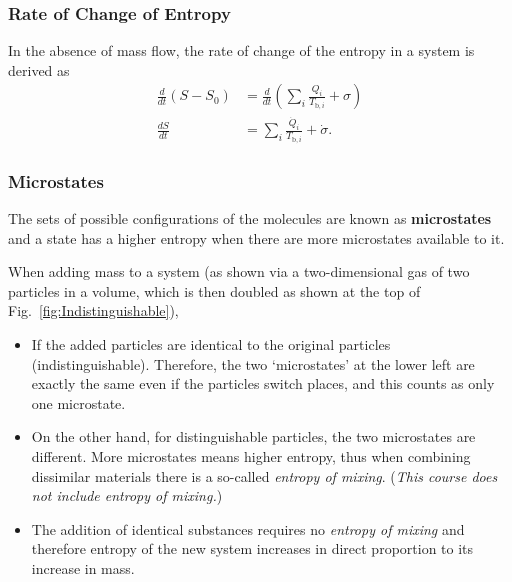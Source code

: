\subsubsection{Rate of Change of Entropy}
In the absence of mass flow, the rate of change of the entropy in a system is derived as 
\begin{align}
\frac{d}{dt}\left(S - S_0\right) &= \frac{d}{dt}\left( \sum_i \frac{Q_i}{T_{\text{b},i}} +\sigma \right) \\
\frac{dS}{dt} &=\sum_i \frac{\dot{Q}_i}{T_{\text{b},i}} +\dot{\sigma}.
\end{align}


\subsubsection{Microstates}
The sets of possible configurations of the molecules are known as \textbf{microstates} and a state has a higher entropy when there are more microstates available to it.

\noindent When adding mass to a system (as shown via
a two-dimensional gas of two particles in a volume, which is then doubled as shown at the top of Fig.~\ref{fig:Indistinguishable}), 
\begin{itemize}
    \item If the added particles are identical to the original particles (indistinguishable).  Therefore, the two `microstates' at the lower left are exactly the same even if the particles switch places, and this counts as only one microstate. 
    \item On the other hand, for distinguishable particles, the two microstates are different. More microstates means higher entropy, thus when combining dissimilar materials there is a so-called \emph{entropy of mixing}. (\emph{This course does not include entropy of mixing.})
    \item The addition of identical substances requires no \emph{entropy of mixing} and therefore entropy of the new system increases in direct proportion to its increase in mass.
\end{itemize}

